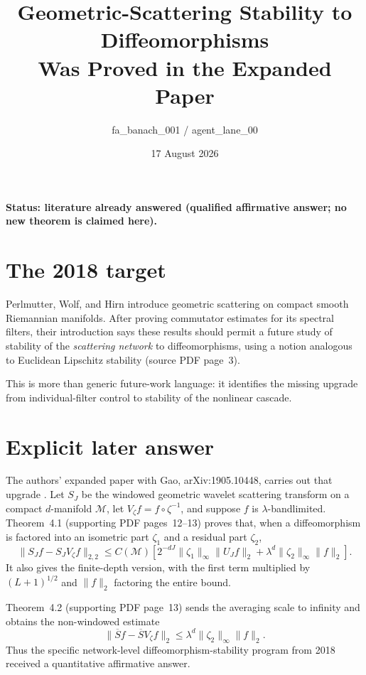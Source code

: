 \documentclass[10pt]{article}
\title{Geometric-Scattering Stability to Diffeomorphisms\\
Was Proved in the Expanded Paper}
\author{fa\_banach\_001 / agent\_lane\_00}
\date{17 August 2026}
\newcommand{\M}{\mathcal M}
\begin{document}
\maketitle
\vspace{-1.2em}
\small

\noindent\textbf{Status: literature already answered (qualified
affirmative answer; no new theorem is claimed here).}

\section*{The 2018 target}

Perlmutter, Wolf, and Hirn introduce geometric scattering on compact smooth
Riemannian manifolds.  After proving commutator estimates for its spectral
filters, their introduction says these results should permit a future study
of stability of the \emph{scattering network} to diffeomorphisms, using a
notion analogous to Euclidean Lipschitz stability
\cite{PWH} (source PDF page~3).

This is more than generic future-work language: it identifies the missing
upgrade from individual-filter control to stability of the nonlinear
cascade.

\section*{Explicit later answer}

The authors' expanded paper with Gao, arXiv:1905.10448, carries out that
upgrade \cite{PGWH}.  Let $S_J$ be the windowed geometric wavelet scattering
transform on a compact $d$-manifold $\M$, let $V_\zeta f=f\circ\zeta^{-1}$,
and suppose $f$ is $\lambda$-bandlimited.  Theorem~4.1 (supporting PDF
pages~12--13) proves that, when a diffeomorphism is factored into an
isometric part $\zeta_1$ and a residual part $\zeta_2$,
\[
 \|S_Jf-S_JV_\zeta f\|_{2,2}
 \le C(\M)\!\left[
 2^{-dJ}\|\zeta_1\|_\infty\|U_Jf\|_2
 +\lambda^d\|\zeta_2\|_\infty\|f\|_2\right].
\]
It also gives the finite-depth version, with the first term multiplied by
$(L+1)^{1/2}$ and $\|f\|_2$ factoring the entire bound.

Theorem~4.2 (supporting PDF page~13) sends the averaging scale to infinity
and obtains the non-windowed estimate
\[
 \|\overline Sf-\overline S V_\zeta f\|_2
 \le \lambda^d\|\zeta_2\|_\infty\|f\|_2.
\]
Thus the specific network-level diffeomorphism-stability program from 2018
received a quantitative affirmative answer.
\end{document}
